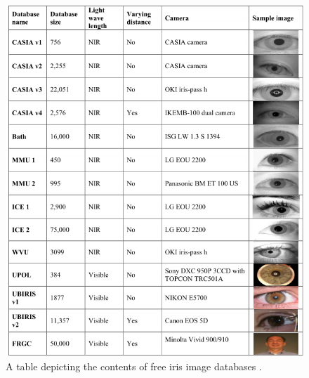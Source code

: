 \begin{figure}[H]
\centering
\includegraphics[width=\textwidth]{figures/Iris_Database_tabel_1.png} 
\caption{A table depicting the contents of free iris image databases  \citep{Rifaee2017}.}
\label{fig:Iris_database_1}
\end{figure}

